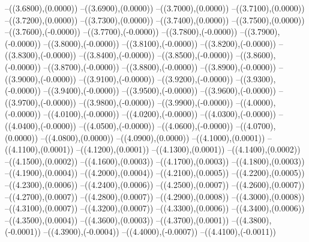 {	--({\sx*(3.6800)},{\sy*(0.0000)})
	--({\sx*(3.6900)},{\sy*(0.0000)})
	--({\sx*(3.7000)},{\sy*(0.0000)})
	--({\sx*(3.7100)},{\sy*(0.0000)})
	--({\sx*(3.7200)},{\sy*(0.0000)})
	--({\sx*(3.7300)},{\sy*(0.0000)})
	--({\sx*(3.7400)},{\sy*(0.0000)})
	--({\sx*(3.7500)},{\sy*(0.0000)})
	--({\sx*(3.7600)},{\sy*(-0.0000)})
	--({\sx*(3.7700)},{\sy*(-0.0000)})
	--({\sx*(3.7800)},{\sy*(-0.0000)})
	--({\sx*(3.7900)},{\sy*(-0.0000)})
	--({\sx*(3.8000)},{\sy*(-0.0000)})
	--({\sx*(3.8100)},{\sy*(-0.0000)})
	--({\sx*(3.8200)},{\sy*(-0.0000)})
	--({\sx*(3.8300)},{\sy*(-0.0000)})
	--({\sx*(3.8400)},{\sy*(-0.0000)})
	--({\sx*(3.8500)},{\sy*(-0.0000)})
	--({\sx*(3.8600)},{\sy*(-0.0000)})
	--({\sx*(3.8700)},{\sy*(-0.0000)})
	--({\sx*(3.8800)},{\sy*(-0.0000)})
	--({\sx*(3.8900)},{\sy*(-0.0000)})
	--({\sx*(3.9000)},{\sy*(-0.0000)})
	--({\sx*(3.9100)},{\sy*(-0.0000)})
	--({\sx*(3.9200)},{\sy*(-0.0000)})
	--({\sx*(3.9300)},{\sy*(-0.0000)})
	--({\sx*(3.9400)},{\sy*(-0.0000)})
	--({\sx*(3.9500)},{\sy*(-0.0000)})
	--({\sx*(3.9600)},{\sy*(-0.0000)})
	--({\sx*(3.9700)},{\sy*(-0.0000)})
	--({\sx*(3.9800)},{\sy*(-0.0000)})
	--({\sx*(3.9900)},{\sy*(-0.0000)})
	--({\sx*(4.0000)},{\sy*(-0.0000)})
	--({\sx*(4.0100)},{\sy*(-0.0000)})
	--({\sx*(4.0200)},{\sy*(-0.0000)})
	--({\sx*(4.0300)},{\sy*(-0.0000)})
	--({\sx*(4.0400)},{\sy*(-0.0000)})
	--({\sx*(4.0500)},{\sy*(-0.0000)})
	--({\sx*(4.0600)},{\sy*(-0.0000)})
	--({\sx*(4.0700)},{\sy*(0.0000)})
	--({\sx*(4.0800)},{\sy*(0.0000)})
	--({\sx*(4.0900)},{\sy*(0.0000)})
	--({\sx*(4.1000)},{\sy*(0.0001)})
	--({\sx*(4.1100)},{\sy*(0.0001)})
	--({\sx*(4.1200)},{\sy*(0.0001)})
	--({\sx*(4.1300)},{\sy*(0.0001)})
	--({\sx*(4.1400)},{\sy*(0.0002)})
	--({\sx*(4.1500)},{\sy*(0.0002)})
	--({\sx*(4.1600)},{\sy*(0.0003)})
	--({\sx*(4.1700)},{\sy*(0.0003)})
	--({\sx*(4.1800)},{\sy*(0.0003)})
	--({\sx*(4.1900)},{\sy*(0.0004)})
	--({\sx*(4.2000)},{\sy*(0.0004)})
	--({\sx*(4.2100)},{\sy*(0.0005)})
	--({\sx*(4.2200)},{\sy*(0.0005)})
	--({\sx*(4.2300)},{\sy*(0.0006)})
	--({\sx*(4.2400)},{\sy*(0.0006)})
	--({\sx*(4.2500)},{\sy*(0.0007)})
	--({\sx*(4.2600)},{\sy*(0.0007)})
	--({\sx*(4.2700)},{\sy*(0.0007)})
	--({\sx*(4.2800)},{\sy*(0.0007)})
	--({\sx*(4.2900)},{\sy*(0.0008)})
	--({\sx*(4.3000)},{\sy*(0.0008)})
	--({\sx*(4.3100)},{\sy*(0.0007)})
	--({\sx*(4.3200)},{\sy*(0.0007)})
	--({\sx*(4.3300)},{\sy*(0.0006)})
	--({\sx*(4.3400)},{\sy*(0.0006)})
	--({\sx*(4.3500)},{\sy*(0.0004)})
	--({\sx*(4.3600)},{\sy*(0.0003)})
	--({\sx*(4.3700)},{\sy*(0.0001)})
	--({\sx*(4.3800)},{\sy*(-0.0001)})
	--({\sx*(4.3900)},{\sy*(-0.0004)})
	--({\sx*(4.4000)},{\sy*(-0.0007)})
	--({\sx*(4.4100)},{\sy*(-0.0011)})
}
